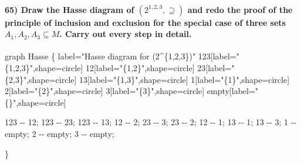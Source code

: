 \documentclass[
]{article}
\newenvironment{Shaded}{}{}
\newcommand{\NormalTok}[1]{#1}
\begin{document}
\hypertarget{draw-the-hasse-diagram-of-2123-supseteq-and-redo-the-proof-of-the-principle-of-inclusion-and-exclusion-for-the-special-case-of-three-sets-a_1-a_2-a_3-subseteq-m.-carry-out-every-step-in-detail.}{%
\paragraph{\texorpdfstring{65) Draw the Hasse diagram of
\((2^{1,2,3}, \supseteq)\) and redo the proof of the principle of
inclusion and exclusion for the special case of three sets
\(A_1, A_2, A_3 \subseteq M\). Carry out every step in
detail.}{65) Draw the Hasse diagram of (2\^{}\{1,2,3\}, \textbackslash supseteq) and redo the proof of the principle of inclusion and exclusion for the special case of three sets A\_1, A\_2, A\_3 \textbackslash subseteq M. Carry out every step in detail.}}\label{draw-the-hasse-diagram-of-2123-supseteq-and-redo-the-proof-of-the-principle-of-inclusion-and-exclusion-for-the-special-case-of-three-sets-a_1-a_2-a_3-subseteq-m.-carry-out-every-step-in-detail.}}

\begin{Shaded}
\begin{Highlighting}[]
\NormalTok{graph Hasse \{ }
\NormalTok{    label="Hasse diagram for (2\^{}\{1,2,3\})"}
\NormalTok{    123[label="\{1,2,3\}",shape=circle]}
\NormalTok{    12[label="\{1,2\}",shape=circle]}
\NormalTok{    23[label="\{2,3\}",shape=circle]}
\NormalTok{    13[label="\{1,3\}",shape=circle]}
\NormalTok{    1[label="\{1\}",shape=circle]}
\NormalTok{    2[label="\{2\}",shape=circle]}
\NormalTok{    3[label="\{3\}",shape=circle]}
\NormalTok{    empty[label="\{\}",shape=circle]}
    
\NormalTok{    123 {-}{-} 12;}
\NormalTok{    123 {-}{-} 23;}
\NormalTok{    123 {-}{-} 13;}
\NormalTok{    12 {-}{-} 2;}
\NormalTok{    23 {-}{-} 3;}
\NormalTok{    23 {-}{-} 2;}
\NormalTok{    12 {-}{-} 1;}
\NormalTok{    13 {-}{-} 1;}
\NormalTok{    13 {-}{-} 3;}
\NormalTok{    1 {-}{-} empty;    }
\NormalTok{    2 {-}{-} empty;}
\NormalTok{    3 {-}{-} empty;}
    
\NormalTok{\} }
\end{Highlighting}
\end{Shaded}
\end{document}
